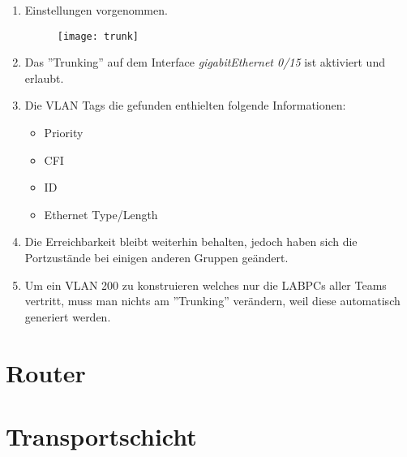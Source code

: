 \documentclass{scrartcl}
\begin{document}
  \renewcommand{\labelenumi}{\alph{enumi})}
  \begin{enumerate}
     \item
     Einstellungen vorgenommen.
     
     \begin{figure}
     \texttt{[image: trunk]}
     \label{fig:trunk}
     \end{figure}
     
     \item
     Das ''Trunking'' auf dem Interface \textit{gigabitEthernet 0/15} ist aktiviert und erlaubt.
     
     \item
     Die VLAN Tags die gefunden enthielten folgende Informationen:
     \begin{itemize}
     \item Priority
     \item CFI
     \item ID
     \item Ethernet Type/Length
     \end{itemize}
    
    \item
    Die Erreichbarkeit bleibt weiterhin behalten, jedoch haben sich die Portzustände bei einigen anderen Gruppen geändert.
    
    \item
    Um ein VLAN 200 zu konstruieren welches nur die LABPCs aller Teams vertritt, muss man nichts am ''Trunking'' verändern, weil diese automatisch generiert werden.
   \end{enumerate}
   
   
  
  

   



  \newpage
\section[Versuch 5 Router]{Router}







  \newpage
\section[Versuch 6 Transportschicht]{Transportschicht}
  
  
  
  
  
  
  
  
  
  
  
\end{document}
